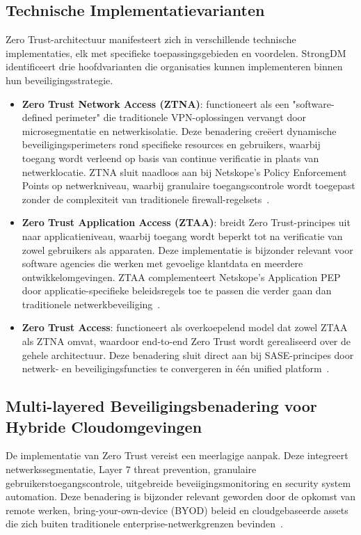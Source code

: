 \subsection{Technische Implementatievarianten}
Zero Trust-architectuur manifesteert zich in verschillende technische implementaties, elk met specifieke toepassingsgebieden en voordelen. StrongDM~\autocite{StrongDM2025} identificeert drie hoofdvarianten die organisaties kunnen implementeren binnen hun beveiligingsstrategie.

\begin{itemize}
  \item \textbf{Zero Trust Network Access (ZTNA)}: functioneert als een "software-defined perimeter" die traditionele VPN-oplossingen vervangt door microsegmentatie en netwerkisolatie. Deze benadering creëert dynamische beveiligingsperimeters rond specifieke resources en gebruikers, waarbij toegang wordt verleend op basis van continue verificatie in plaats van netwerklocatie. ZTNA sluit naadloos aan bij Netskope's Policy Enforcement Points op netwerkniveau, waarbij granulaire toegangscontrole wordt toegepast zonder de complexiteit van traditionele firewall-regelsets~\autocite{StrongDM2025}.
  \item \textbf{Zero Trust Application Access (ZTAA)}: breidt Zero Trust-principes uit naar applicatieniveau, waarbij toegang wordt beperkt tot na verificatie van zowel gebruikers als apparaten. Deze implementatie is bijzonder relevant voor software agencies die werken met gevoelige klantdata en meerdere ontwikkelomgevingen. ZTAA complementeert Netskope's Application PEP door applicatie-specifieke beleidsregels toe te passen die verder gaan dan traditionele netwerkbeveiliging~\autocite{StrongDM2025}.
  \item \textbf{Zero Trust Access}: functioneert als overkoepelend model dat zowel ZTAA als ZTNA omvat, waardoor end-to-end Zero Trust wordt gerealiseerd over de gehele architectuur. Deze  benadering sluit direct aan bij SASE-principes door netwerk- en beveiligingsfuncties te convergeren in één unified platform~\autocite{StrongDM2025}.
\end{itemize}

\vspace{2ex}

\subsection{Multi-layered Beveiligingsbenadering voor Hybride Cloudomgevingen}
De implementatie van Zero Trust vereist een meerlagige aanpak. Deze integreert netwerkssegmentatie, Layer 7 threat prevention, granulaire gebruikerstoegangscontrole, uitgebreide beveiigingsmonitoring en security system automation. Deze benadering is bijzonder relevant geworden door de opkomst van remote werken, bring-your-own-device (BYOD) beleid en cloudgebaseerde assets die zich buiten traditionele enterprise-netwerkgrenzen bevinden~\autocite{StrongDM2025}.

